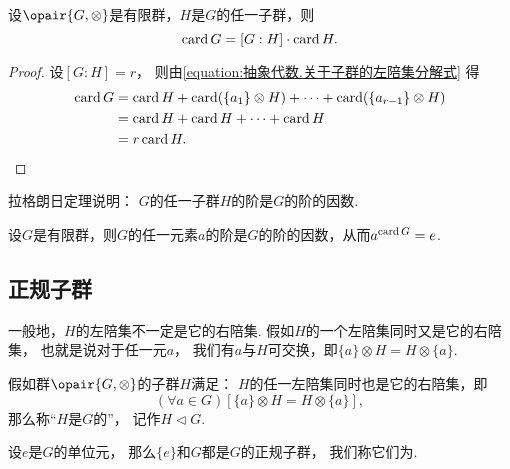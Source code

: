 \begin{theorem}[拉格朗日定理]
设\(\opair{G,\otimes}\)是有限群，\(H\)是\(G\)的任一子群，则\[
	\operatorname{card} G = [G:H] \cdot \operatorname{card} H.
\]
\begin{proof}
设\([G:H]=r\)，
则由\cref{equation:抽象代数.关于子群的左陪集分解式} 得\begin{align*}
	\operatorname{card} G
	&= \operatorname{card} H + \operatorname{card}(\{a_1\} \otimes H) + \dotsb + \operatorname{card}(\{a_{r-1}\} \otimes H) \\
	&= \operatorname{card} H + \operatorname{card} H + \dotsb + \operatorname{card} H \\
	&= r \operatorname{card} H.
	\qedhere
\end{align*}
\end{proof}
\end{theorem}
拉格朗日定理说明：
\(G\)的任一子群\(H\)的阶是\(G\)的阶的因数.

\begin{corollary}
设\(G\)是有限群，则\(G\)的任一元素\(a\)的阶是\(G\)的阶的因数，从而\(a^{\operatorname{card} G}=e\).
\end{corollary}


\endgroup%

\subsection{正规子群}
一般地，\(H\)的左陪集不一定是它的右陪集.
假如\(H\)的一个左陪集同时又是它的右陪集，
也就是说对于任一元\(a\)，
我们有\(a\)与\(H\)可交换，即\(\{a\} \otimes H = H \otimes \{a\}\).
\begin{definition}
假如群\(\opair{G,\otimes}\)的子群\(H\)满足：
\(H\)的任一左陪集同时也是它的右陪集，即\[
	(\forall a\in G)[\{a\} \otimes H = H \otimes \{a\}],
\]
那么称“\(H\)是\(G\)的”，
记作\(H \triangleleft G\).
\end{definition}

设\(e\)是\(G\)的单位元，
那么\(\{e\}\)和\(G\)都是\(G\)的正规子群，
我们称它们为.
